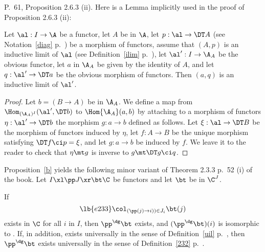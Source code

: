 \documentclass[12pt]{article}
\theoremstyle{remark}
\theoremstyle{definition}
\begin{document}

\begin{s} 
P.~61, Proposition 2.6.3 (ii). Here is a Lemma implicitly used in the proof of Proposition 2.6.3 (ii): 

\begin{lem} 
Let $\al:I\to\A$ be a functor, let $A$ be in $\A$, let $p:\al\to\DT A$ (see Notation~\ref{diag} p.~) be a morphism of functors, assume that $(A,p)$ is an inductive limit of $\al$ (see Definition~\ref{ilim} p.~), let $\al':I\to\A_A$ be the obvious functor, let $a$ in $\A_A$ be given by the identity of $A$, and let $q:\al'\to\DT a$ be the obvious morphism of functors. Then $(a,q)$ is an inductive limit of $\al'$. 
\end{lem} 

\begin{proof}
Let $b=(B\to A)$ be in $\A_A$. We define a map from $\Hom_{(\A_A)^I}(\al',\DT b)$ to $\Hom{\A_A}(a,b)$ by attaching to a morphism of functors $\eta:\al'\to\DT b$ the morphism $g:a\to b$ defined as follows. Let $\xi:\al\to\DT B$ be the morphism of functors induced by $\eta$, let $f:A\to B$ be the unique morphism satisfying $\DT f\ci p=\xi$, and let $g:a\to b$ be induced by $f$. We leave it to the reader to check that $\eta\mt g$ is inverse to $g\mt\DT g\ci q$.
\end{proof}
\end{s}


\begin{s} 
Proposition~\ref{b} yields the following minor variant of Theorem 2.3.3 p.~52 (i) of the book. Let $I\xl\pp J\xr\bt\C$ be functors and let $\bt$ be in $\C^J$. 

\begin{thm}[Theorem 2.3.3 (i) p. 52]
If 
\begin{equation}\lb{e233}
\col_{(\pp(j)\to i))\in J_i}\bt(j)
\end{equation}
exists in $\C$ for all $i$ in $I$, then $\pp^\dg\bt$ exists, and $(\pp^\dg\bt)(i)$ is isomorphic to . If, in addition,  exists universally in the sense of Definition~\ref{uil} p.~, then $\pp^\dg\bt$ exists universally in the sense of Definition~\ref{232} p.~. 
\end{thm}
\end{s}
\end{document}
